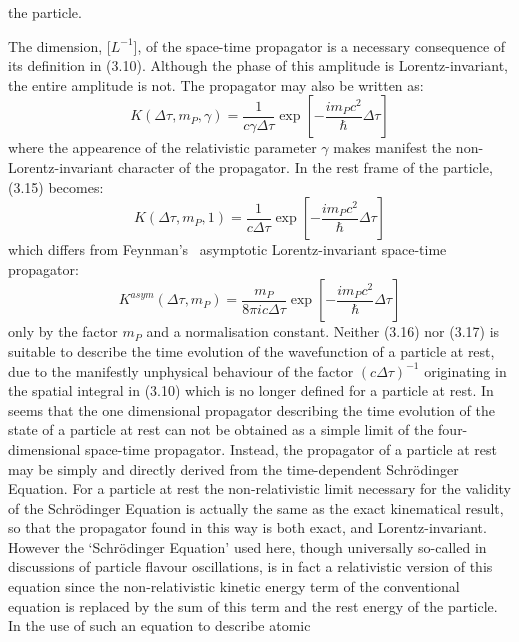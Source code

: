 \documentclass [12pt]{article}
\begin{document}
{    the particle.
    \par The dimension, [$L^{-1}$], of the space-time propagator is a necessary consequence of its definition
     in (3.10). Although the phase of this amplitude is Lorentz-invariant, the entire amplitude is not.
     The propagator may also be written as:
      \begin{equation}
   K( \Delta \tau, m_P, \gamma)  =   \frac{1}{ c \gamma \Delta \tau}
 \exp\left[-\frac{i m_P c^2}{\hbar} \Delta  \tau\right]
       \end{equation}
   where the appearence of the relativistic parameter $\gamma$ makes manifest the non-Lorentz-invariant
  character of the propagator.
  In the rest frame of the particle,  (3.15) becomes:
     \begin{equation}
   K( \Delta \tau, m_P, 1)  =   \frac{1}{ c \Delta \tau }
 \exp\left[-\frac{i m_P c^2}{\hbar} \Delta  \tau\right]
       \end{equation}
  which differs from Feynman's~\cite{Feynprop} asymptotic Lorentz-invariant space-time propagator:
     \begin{equation}
   K^{asym}( \Delta \tau, m_P)  =   \frac{m_P}{ 8 \pi i c \Delta \tau }
 \exp\left[-\frac{i m_P c^2}{\hbar} \Delta  \tau\right]
       \end{equation}
  only by the factor $m_P$ and a normalisation constant.
  Neither (3.16) nor (3.17) is suitable to describe the time
 evolution of the wavefunction of a particle at rest, due to the manifestly 
  unphysical behaviour of the factor $(c\Delta  \tau)^{-1}$ originating in the spatial
 integral in (3.10) which is no longer defined for a particle at rest.
  In seems that the one dimensional propagator describing the time evolution 
  of the state of a particle at rest can not be obtained as a simple
  limit of the four-dimensional space-time propagator. Instead, the propagator
 of a particle at rest may be simply and directly derived from
  the time-dependent Schr\"{o}dinger Equation. For a particle at rest
  the non-relativistic limit necessary for the validity of the Schr\"{o}dinger Equation
  is actually the same as the exact kinematical result, so that the propagator found
 in this way is both exact, and Lorentz-invariant.
   However the `Schr\"{o}dinger Equation' used here, though universally so-called 
  in discussions of particle flavour oscillations, is in fact a relativistic 
  version of this equation since the non-relativistic kinetic energy term 
 of the conventional equation is replaced by the sum of this term and the rest
  energy of the particle. In the use of such an equation to describe atomic
}
\end{document}
